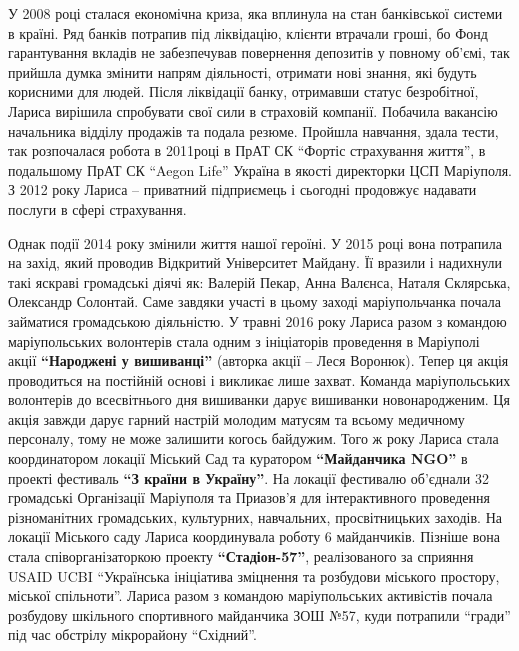
У 2008 році сталася економічна криза, яка вплинула на стан банківської системи
в країні. Ряд банків потрапив під ліквідацію, клієнти втрачали гроші, бо Фонд
гарантування вкладів не забезпечував повернення депозитів у повному об'ємі, так
прийшла думка змінити напрям діяльності, отримати нові знання, які будуть
корисними для людей. Після ліквідації банку, отримавши статус безробітної,
Лариса вирішила спробувати свої сили в страховій компанії. Побачила вакансію
начальника відділу продажів та подала резюме. Пройшла навчання, здала тести,
так розпочалася робота в 2011році в ПрАТ СК \enquote{Фортіс страхування життя}, в
подальшому ПрАТ СК \enquote{Aegon Life} Україна в якості директорки ЦСП Маріуполя. З
2012 року Лариса – приватний підприємець і сьогодні продовжує надавати послуги
в сфері страхування.


Однак події 2014 року змінили життя нашої героїні. У 2015 році вона потрапила
на захід, який проводив Відкритий Університет Майдану. Її вразили і надихнули
такі яскраві громадські діячі як: Валерій Пекар, Анна Валєнса, Наталя
Склярська, Олександр Солонтай. Саме завдяки участі в цьому заході
маріупольчанка почала займатися громадською діяльністю. У травні 2016 року
Лариса разом з командою маріупольських волонтерів стала одним з ініціаторів
проведення в Маріуполі акції \textbf{\enquote{Народжені у вишиванці}} (авторка
акції – Леся Воронюк). Тепер ця акція проводиться на постійній основі і
викликає лише захват. Команда маріупольських волонтерів до всесвітнього дня
вишиванки дарує вишиванки новонародженим. Ця акція завжди дарує гарний настрій
молодим матусям та всьому медичному персоналу, тому не може залишити когось
байдужим. Того ж року Лариса стала координатором локації Міський Сад та
куратором \textbf{\enquote{Майданчика NGO}} в проекті фестиваль
\textbf{\enquote{З країни в Україну}}. На локації фестивалю об'єднали 32
громадські Організації Маріуполя та Приазов'я для інтерактивного проведення
різноманітних громадських, культурних, навчальних, просвітницьких заходів. На
локації Міського саду Лариса координувала роботу 6 майданчиків. Пізніше вона
стала співорганізаторкою проекту \textbf{\enquote{Стадіон-57}}, реалізованого
за сприяння USAID UCBI \enquote{Українська ініціатива зміцнення та розбудови
міського простору, міської спільноти}. Лариса разом з командою маріупольських
активістів почала розбудову шкільного спортивного майданчика ЗОШ №57, куди
потрапили \enquote{гради} під час обстрілу мікрорайону \enquote{Східний}.

